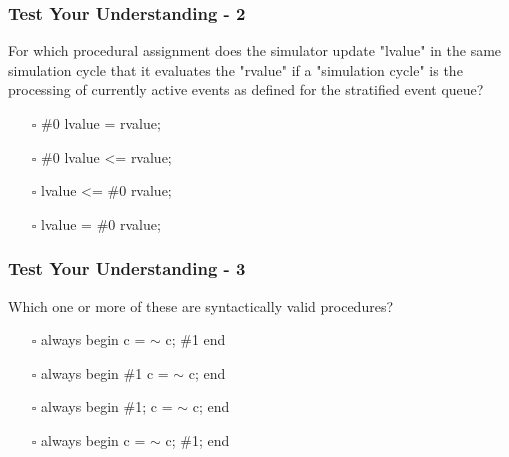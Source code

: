 \documentclass[t, notes, xcolor=table]{beamer}
\begin{document}
\begin{frame}
\frametitle{Test Your Understanding - 2}
For which procedural assignment does the simulator update "lvalue" in the same simulation cycle that it evaluates the "rvalue" if a "simulation cycle" is the processing of currently active events as defined for the stratified event queue?
\begin{itemize}
\item[$\square$] \#0 lvalue = rvalue;
\item[$\square$] \#0 lvalue \textless = rvalue;
\item[$\square$] lvalue \textless = \#0 rvalue;
\item[$\square$] lvalue = \#0 rvalue;
\end{itemize}
\end{frame}

\begin{frame}
\frametitle{Test Your Understanding - 3}
Which one or more of these are syntactically valid procedures?
\begin{itemize}
\item[$\square$] always begin c = $\sim$ c; \#1 end
\item[$\square$] always begin \#1 c = $\sim$ c; end
\item[$\square$] always begin \#1; c = $\sim$ c; end
\item[$\square$] always begin c = $\sim$ c; \#1; end
\end{itemize}
\end{frame}
\end{document}
